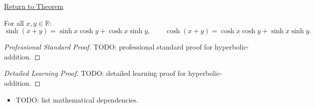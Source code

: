 \newpage
{}
\label{prf:hyperbolic-addition}

\begin{remark*}[Return]
\hyperref[prop:hyperbolic-addition]{Return to Theorem}
\end{remark*}

\begin{proposition*}
For all $x, y \in \mathbb{R}$:
\[
  \sinh(x+y) = \sinh x \cosh y + \cosh x \sinh y,
  \qquad
  \cosh(x+y) = \cosh x \cosh y + \sinh x \sinh y.
\]

\smallskip\noindent
\end{proposition*}

\begin{proof}[Professional Standard Proof]
\LRAProofBodyStart
TODO: professional standard proof for hyperbolic-addition.
\end{proof}

\begin{proof}[Detailed Learning Proof]
\LRAProofBodyStart
TODO: detailed learning proof for hyperbolic-addition.
\end{proof}

\begin{remark*}
\end{remark*}

\begin{dependencies}
\begin{itemize}
  \item TODO: list mathematical dependencies.
\end{itemize}
\end{dependencies}

\clearpage
